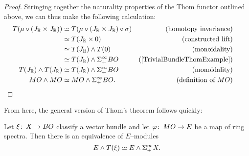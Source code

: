 \begin{proof}
Stringing together the naturality properties of the Thom functor outlined above, we can thus make the following calculation:
\begin{align*}
T(\mu \circ (J_{\R} \times J_{\R})) & \simeq T(\mu \circ (J_{\R} \times J_{\R}) \circ \sigma) & \text{(homotopy invariance)} \\
& \simeq T(J_{\R} \times 0) & \text{(constructed lift)} \\
& \simeq T(J_{\R}) \sm T(0) & \text{(monoidality)} \\
& \simeq T(J_{\R}) \sm \Susp^\infty_+ BO & \text{(\Cref{TrivialBundleThomExample})} \\
T(J_{\R}) \sm T(J_{\R}) & \simeq T(J_{\R}) \sm \Susp^\infty_+ BO & \text{(monoidality)} \\
MO \sm MO & \simeq MO \sm \Susp^\infty_+ BO. & \text{(definition of $MO$)} & \phantom{.} \qedhere
\end{align*}
\end{proof}

\noindent From here, the general version of Thom's theorem follows quickly:

\begin{theorem}
Let $\xi\colon\thinspace X \to BO$ classify a vector bundle and let $\varphi\colon\thinspace MO \to E$ be a map of ring spectra. Then there is an equivalence of $E$--modules \[E \wedge T(\xi) \simeq E \wedge \Sigma^\infty_+ X.\]
\end{theorem}

